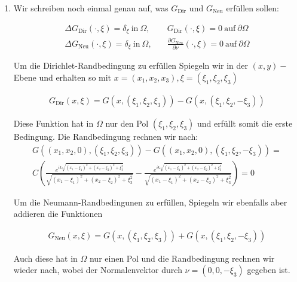\begin{solution}
\begin{enumerate}[label = (\roman*)]
\item Wir schreiben noch einmal genau auf, was $G_{\mathrm{Dir}}$ und $G_{\mathrm{Neu}}$ erfüllen sollen:

\begin{align*}
  \Delta G_\mathrm{Dir}(\cdot, \xi) = \delta_\xi ~\text{in}~ \Omega,&
  \quad
  G_\mathrm{Dir}(\cdot, \xi) = 0 ~\text{auf}~ \partial \Omega \\
  \Delta G_\mathrm{Neu}(\cdot, \xi) = \delta_\xi ~\text{in}~ \Omega,&
  \quad
  \frac{\partial G_\mathrm{Neu}}{\partial \nu}(\cdot, \xi) = 0 ~\text{auf}~ \partial \Omega
\end{align*}

Um die Dirichlet-Randbedingung zu erfüllen Spiegeln wir in der $(x,y)-$Ebene und erhalten so mit $x = (x_1,x_2,x_3), \xi = (\xi_1, \xi_2, \xi_3)$

\begin{align*}
  G_\mathrm{Dir}(x,\xi) = G(x,(\xi_1, \xi_2, \xi_3)) - G(x,(\xi_1,\xi_2, -\xi_3))
\end{align*}

Diese Funktion hat in $\Omega$ nur den Pol $(\xi_1, \xi_2, \xi_3)$ und erfüllt somit die erste Bedingung. Die Randbedingung rechnen wir nach:
\begin{align*}
  G((x_1,x_2,0),(\xi_1, \xi_2, \xi_3)) - G((x_1,x_2,0),(\xi_1,\xi_2, -\xi_3))
  = \\
  C(\frac{e^{ik\sqrt{(x_1 - \xi_1)^2 + (x_2 - \xi_2)^2 + \xi_3^2 }}}{\sqrt{(x_1 - \xi_1)^2 + (x_2 - \xi_2)^2 + \xi_3^2 }}
    -\frac{e^{ik\sqrt{(x_1 - \xi_1)^2 + (x_2 - \xi_2)^2 + \xi_3^2 }}}{\sqrt{(x_1 - \xi_1)^2 + (x_2 - \xi_2)^2 + \xi_3^2 }})
  =
  0
\end{align*}

Um die Neumann-Randbedingunen zu erfüllen, Spiegeln wir ebenfalls aber addieren die Funktionen

\begin{align*}
  G_\mathrm{Neu}(x,\xi) = G(x,(\xi_1, \xi_2, \xi_3)) + G(x,(\xi_1,\xi_2, -\xi_3))
\end{align*}

Auch diese hat in $\Omega$ nur einen Pol und die Randbedingung rechnen wir wieder nach, wobei der Normalenvektor durch $\nu = (0,0,-\xi_3)$ gegeben ist.


\end{enumerate}
\end{solution}
